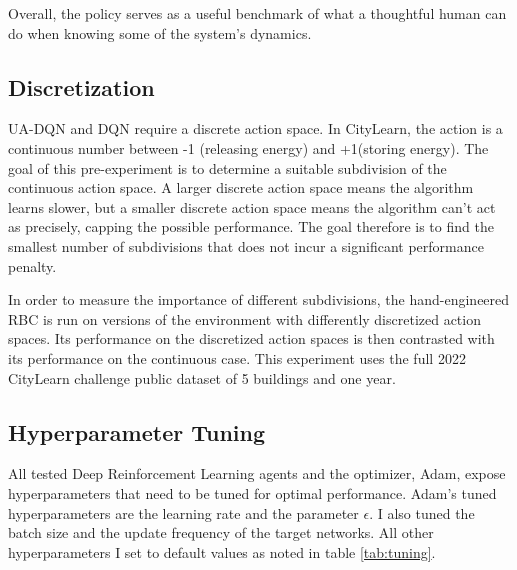 Overall, the policy serves as a useful benchmark of what a thoughtful human can do when knowing some of the system's dynamics.

\subsection{Discretization} \label{sec:discretization}
UA-DQN and DQN require a discrete action space.
In CityLearn, the action is a continuous number between -1 (releasing energy) and +1(storing energy).
The goal of this pre-experiment is to determine a suitable subdivision of the continuous action space.
A larger discrete action space means the algorithm learns slower, but a smaller discrete action space means the algorithm can't act as precisely, capping the possible performance.
The goal therefore is to find the smallest number of subdivisions that does not incur a significant performance penalty.

In order to measure the importance of different subdivisions, the hand-engineered RBC is run on versions of the environment with differently discretized action spaces.
Its performance on the discretized action spaces is then contrasted with its performance on the continuous case.
This experiment uses the full 2022 CityLearn challenge public dataset of 5 buildings and one year.

\subsection{Hyperparameter Tuning}
All tested Deep Reinforcement Learning agents and the optimizer, Adam, expose hyperparameters that need to be tuned for optimal performance.
Adam's tuned hyperparameters are the learning rate and the parameter $\epsilon$.
I also tuned the batch size and the update frequency of the target networks.
All other hyperparameters I set to default values as noted in table \ref{tab:tuning}.

